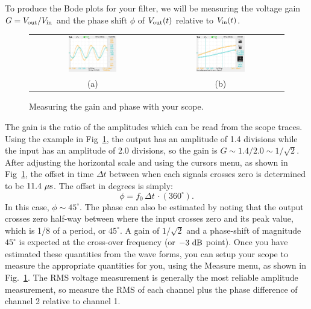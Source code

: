 \noindent To produce the Bode plots for your filter,
we will be measuring the voltage gain $G = V_{\rm out} / V_{\rm in}$
and the phase shift $\phi$ of $V_{\rm out}(t)$ relative to $V_{\rm
  in}(t)$.

\begin{figure}[htbp]
\begin{center}
\begin{tabular}{cc}
\includegraphics[width=0.4\textwidth]{figs/labs/filters/phase_measure.jpg} &
\includegraphics[width=0.4\textwidth]{figs/labs/filters/phase_cursor.jpg} \\
(a) & (b) \\
\end{tabular}
\end{center}
\caption{\label{fig:scopegain} Measuring the gain and phase with your scope.}
\end{figure}

The gain is the ratio of the amplitudes which can be read from the
scope traces.  Using the example in Fig~\ref{fig:scopegain}, the
output has an amplitude of 1.4 divisions while the input has an
amplitude of 2.0 divisions, so the gain is $G \sim 1.4/2.0 \sim
1/\sqrt{2}$.  After adjusting the horizontal scale and using the cursors menu, as
shown in Fig~\ref{fig:scopegain}, the offset in time $\Delta t$
between when each signals crosses zero is determined to be $11.4~\rm
\mu s$.  The offset in degrees is simply: 
\begin{displaymath}
\phi =  f_0 \, \Delta t \, \cdot (360^\circ).
\end{displaymath}
In this case, $\phi \sim 45^\circ$.  The phase can also be estimated
by noting that the output crosses zero half-way between where the
input crosses zero and its peak value, which is 1/8 of a period, or
$45^\circ$.  A gain of $1/\sqrt{2}$ and a phase-shift of magnitude
$45^\circ$ is expected at the cross-over frequency (or $-3~\rm dB$
point). Once you have estimated these quantities from the wave forms, you can
setup your scope to measure the appropriate quantities for you, using
the Measure menu, as shown in Fig.~\ref{fig:scopegain}.  The RMS
voltage measurement is generally the most reliable amplitude
measurement, so measure the RMS of each channel plus the phase
difference of channel 2 relative to channel 1.

